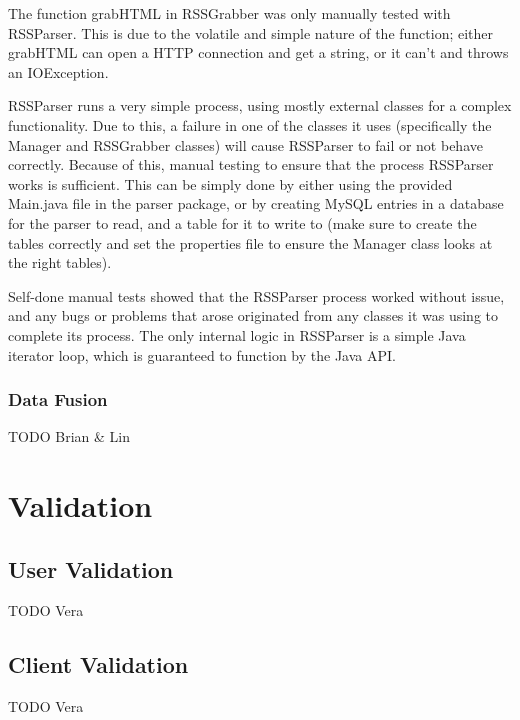\documentclass[11pt]{article} %
\begin{document}
The function grabHTML in RSSGrabber was only manually tested with RSSParser. This is due to the volatile and simple nature of the function; either grabHTML can open a HTTP connection and get a string, or it can’t and throws an IOException.

RSSParser runs a very simple process, using mostly external classes for a complex functionality. Due to this, a failure in one of the classes it uses (specifically the Manager and RSSGrabber classes) will cause RSSParser to fail or not behave correctly. Because of this, manual testing to ensure that the process RSSParser works is sufficient. This can be simply done by either using the provided Main.java file in the parser package, or by creating MySQL entries in a database for the parser to read, and a table for it to write to (make sure to create the tables correctly and set the properties file to ensure the Manager class looks at the right tables).

Self-done manual tests showed that the RSSParser process worked without issue, and any bugs or problems that arose originated from any classes it was using to complete its process. The only internal logic in RSSParser is a simple Java iterator loop, which is guaranteed to function by the Java API.

\subsubsection{Data Fusion}

TODO Brian \& Lin

\section{Validation}

\subsection{User Validation}

TODO Vera

\subsection{Client Validation}

TODO Vera

\end{document}
